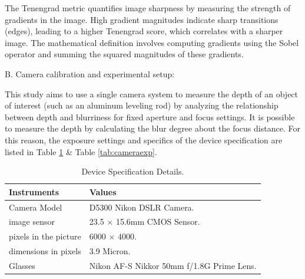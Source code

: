 \documentclass[sn-mathphys]{sn-jnl}%
\theoremstyle{thmstyleone}%
\theoremstyle{thmstyletwo}%
\theoremstyle{thmstylethree}%
\begin{document}
The Tenengrad metric quantifies image sharpness by measuring the strength of gradients in the image. High gradient magnitudes indicate sharp transitions (edges), leading to a higher Tenengrad score, which correlates with a sharper image. The mathematical definition involves computing gradients using the Sobel operator and summing the squared magnitudes of these gradients.




B. {Camera calibration and experimental setup}:
 
This study aims to use a single camera system to measure the depth of an object of interest (such as an aluminum leveling rod) by analyzing the relationship between depth and blurriness for fixed aperture and focus settings. It is possible to measure the depth by calculating the blur degree about the focus distance. For this reason, the exposure settings and specifics of the device specification are listed in Table \ref{tab:cameraspec} \&  Table \ref{tab:cameraexp}.

\begin{table}[t]
	\caption{Device Specification Details.}
	\label{tab:cameraspec}
	  \centering
		 \begin{tabular} {|l l |}
		  \hline
		    Instruments & Values \\
		   \hline
		     Camera Model & D5300 Nikon DSLR Camera. \\
		   \hline
		   image sensor & 23.5 $\times$ 15.6mm CMOS Sensor.\\
		   \hline
		    pixels in the picture & 6000 $\times$ 4000.\\
		   \hline
		    dimensions in pixels  & 3.9 Micron.\\
		   \hline
		    Glasses & Nikon AF-S Nikkor 50mm f/1.8G Prime Lens.\\
			 \hline
     \end{tabular}
	\end{table}
\end{document}
